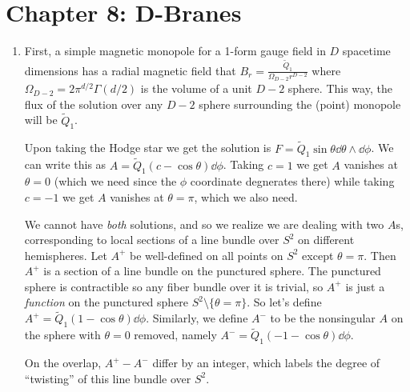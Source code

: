 \documentclass[11pt, class=article, crop=false]{standalone}
\begin{document}
\section*{Chapter 8: D-Branes} %
\label{sec:chapter_8_d_branes}

\begin{enumerate}
	\item First, a simple magnetic monopole for a 1-form gauge field in $D$ spacetime dimensions has a radial magnetic field that $B_r = \frac{\tilde Q_1}{\Omega_{D-2} r^{D-2}}$ where $\Omega_{D-2} = 2 \pi^{d/2} \Gamma(d/2)$ is the volume of a unit $D-2$ sphere. This way, the flux of the solution over any $D-2$ sphere surrounding the (point) monopole will be $\tilde Q_1$.
	
	Upon taking the Hodge star we get the solution is $F = \tilde Q_1 \sin \theta \dd \theta \wedge \dd \phi$. We can write this as $A = \tilde Q_1 (c - \cos \theta) \dd \phi$. Taking $c = 1$ we get $A$ vanishes at $\theta = 0$ (which we need since the $\phi$ coordinate degnerates there) while taking $c = -1$ we get $A$ vanishes at $\theta = \pi$, which we also need.
	
	We cannot have \emph{both} solutions, and so we realize we are dealing with two $A$s, corresponding to local sections of a line bundle over $S^2$ on different hemispheres. Let $A^+$ be well-defined on all points on $S^2$ except $\theta = \pi$. Then $A^+$ is a section of a line bundle on the punctured sphere. The punctured sphere is contractible so any fiber bundle over it is trivial, so $A^+$ is just a \emph{function} on the punctured sphere $S^2 \setminus \{\theta = \pi\}$. So let's define $A^+ = \tilde Q_1 (1- \cos \theta) \dd \phi$. Similarly, we define $A^-$ to be the nonsingular $A$ on the sphere with $\theta = 0$ removed, namely $A^- = \tilde Q_1 (-1 -\cos \theta) \dd \phi$. 
	
	On the overlap, $A^+ - A^-$ differ by an integer, which labels the degree of ``twisting'' of this line bundle over $S^2$. 
	

\end{enumerate}
\end{document}

